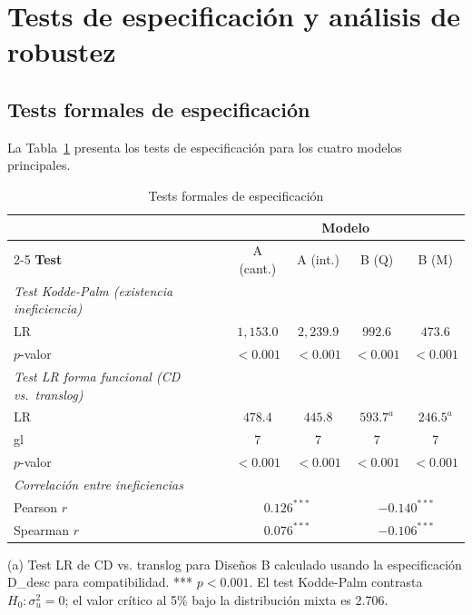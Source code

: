 \documentclass[12pt, a4paper]{article}
\begin{document}
\section{Tests de especificación y análisis de robustez}
\label{sec:robustez}

\subsection{Tests formales de especificación}
\label{sec:tests}

La Tabla~\ref{tab:tests_spec} presenta los tests de
especificación para los cuatro modelos principales.

\begin{table}[h!]
\centering
\caption{Tests formales de especificación}
\label{tab:tests_spec}
\begin{threeparttable}
\begin{tabular}{lcccc}
\toprule
& \multicolumn{4}{c}{\textbf{Modelo}} \\
\cmidrule{2-5}
\textbf{Test} & A (cant.) & A (int.) & B (Q) & B (M) \\
\midrule
\textit{Test Kodde-Palm (existencia ineficiencia)} \\
\quad LR & $1{,}153.0$ & $2{,}239.9$ & $992.6$ & $473.6$ \\
\quad $p$-valor & $<0.001$ & $<0.001$ & $<0.001$ & $<0.001$ \\[4pt]
\textit{Test LR forma funcional (CD vs.\ translog)} \\
\quad LR & $478.4$ & $445.8$ & $593.7^{a}$ & $246.5^{a}$ \\
\quad gl & 7 & 7 & 7 & 7 \\
\quad $p$-valor & $<0.001$ & $<0.001$ & $<0.001$ & $<0.001$ \\[4pt]
\textit{Correlación entre ineficiencias} \\
\quad Pearson $r$ & \multicolumn{2}{c}{$0.126^{***}$}
  & \multicolumn{2}{c}{$-0.140^{***}$} \\
\quad Spearman $r$ & \multicolumn{2}{c}{$0.076^{***}$}
  & \multicolumn{2}{c}{$-0.106^{***}$} \\
\bottomrule
\end{tabular}
\begin{tablenotes}
  \small
  \item (a) Test LR de CD vs. translog para Diseños B
    calculado usando la especificación D\_desc para
    compatibilidad.
    *** $p<0.001$.
    El test Kodde-Palm \citep{kodde1986} contrasta
    $H_0: \sigma^2_u = 0$; el valor crítico al 5\% bajo
    la distribución mixta es 2.706.
\end{tablenotes}
\end{threeparttable}
\end{table}
\end{document}

